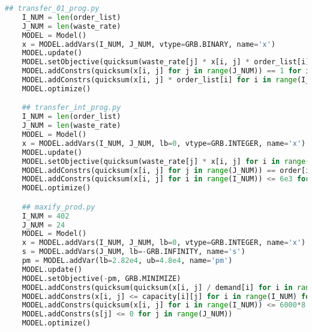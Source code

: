 \documentclass[withoutpreface,bwprint]{cumcmthesis} %
\begin{document}
\begin{appendices}
\begin{lstlisting}[language=python]
    ## transfer_01_prog.py
    I_NUM = len(order_list)
    J_NUM = len(waste_rate)
    MODEL = Model()
    x = MODEL.addVars(I_NUM, J_NUM, vtype=GRB.BINARY, name='x')
    MODEL.update()
    MODEL.setObjective(quicksum(waste_rate[j] * x[i, j] * order_list[i] for i in range(I_NUM) for j in range(J_NUM)), GRB.MINIMIZE)
    MODEL.addConstrs(quicksum(x[i, j] for j in range(J_NUM)) == 1 for i in range(I_NUM))
    MODEL.addConstrs(quicksum(x[i, j] * order_list[i] for i in range(I_NUM)) <= 6e3 for j in range(J_NUM))
    MODEL.optimize()

    ## transfer_int_prog.py
    I_NUM = len(order_list)
    J_NUM = len(waste_rate)
    MODEL = Model()
    x = MODEL.addVars(I_NUM, J_NUM, lb=0, vtype=GRB.INTEGER, name='x')
    MODEL.update()
    MODEL.setObjective(quicksum(waste_rate[j] * x[i, j] for i in range(I_NUM) for j in range(J_NUM)), GRB.MINIMIZE)
    MODEL.addConstrs(quicksum(x[i, j] for j in range(J_NUM)) == order[i][week] for i in range(I_NUM))
    MODEL.addConstrs(quicksum(x[i, j] for i in range(I_NUM)) <= 6e3 for j in range(J_NUM))
    MODEL.optimize()

    ## maxify_prod.py
    I_NUM = 402
    J_NUM = 24
    MODEL = Model()
    x = MODEL.addVars(I_NUM, J_NUM, lb=0, vtype=GRB.INTEGER, name='x')
    s = MODEL.addVars(J_NUM, lb=-GRB.INFINITY, name='s')
    pm = MODEL.addVar(lb=2.82e4, ub=4.8e4, name='pm')
    MODEL.update()
    MODEL.setObjective(-pm, GRB.MINIMIZE)
    MODEL.addConstrs(quicksum(quicksum(x[i, j] / demand[i] for i in range(I_NUM)) for j in range(k)) + s[k - 1] == pm * k for k in range(1, J_NUM + 1))
    MODEL.addConstrs(x[i, j] <= capacity[i][j] for i in range(I_NUM) for j in range(J_NUM))
    MODEL.addConstrs(quicksum(x[i, j] for i in range(I_NUM)) <= 6000*8 for j in range(J_NUM))
    MODEL.addConstrs(s[j] <= 0 for j in range(J_NUM))
    MODEL.optimize()

\end{lstlisting}

\end{appendices}
\end{document}
